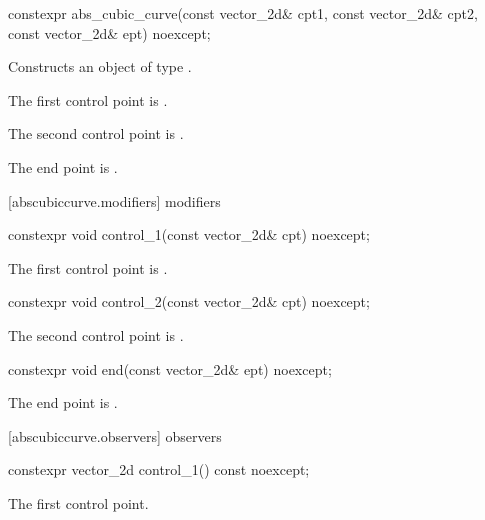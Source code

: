 %
\begin{itemdecl}
constexpr abs_cubic_curve(const vector_2d& cpt1, const vector_2d& cpt2,
  const vector_2d& ept) noexcept;
\end{itemdecl}
\begin{itemdescr}
\pnum
\effects
Constructs an object of type .

\pnum
The first control point is .

\pnum
The second control point is .

\pnum
The end point is .
\end{itemdescr}

 [abscubiccurve.modifiers]{ modifiers}%

%
\begin{itemdecl}
constexpr void control_1(const vector_2d& cpt) noexcept;
\end{itemdecl}
\begin{itemdescr}
\pnum
\effects
The first control point is .
\end{itemdescr}

%
\begin{itemdecl}
constexpr void control_2(const vector_2d& cpt) noexcept;
\end{itemdecl}
\begin{itemdescr}
\pnum
\effects
The second control point is .
\end{itemdescr}

%
\begin{itemdecl}
constexpr void end(const vector_2d& ept) noexcept;
\end{itemdecl}
\begin{itemdescr}
\pnum
\effects
The end point is .
\end{itemdescr}

 [abscubiccurve.observers]{ observers}%

%
\begin{itemdecl}
constexpr vector_2d control_1() const noexcept;
\end{itemdecl}
\begin{itemdescr}
\pnum
\returns
The first control point.
\end{itemdescr}

